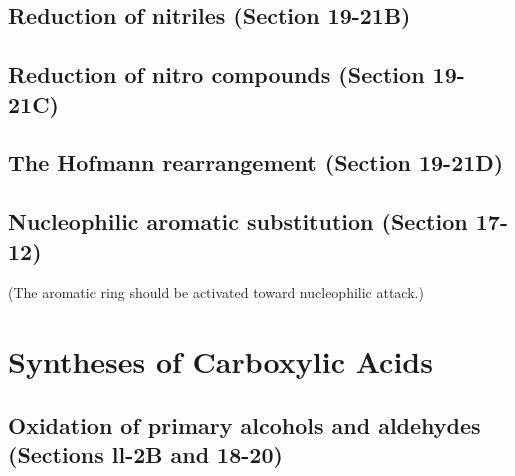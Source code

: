 \subsection{Reduction of nitriles \normalfont(Section 19-21B)}



\subsection{ Reduction of nitro compounds \normalfont(Section 19-21C)}



\subsection{The Hofmann rearrangement \normalfont(Section 19-21D)}



\subsection{Nucleophilic aromatic substitution \normalfont(Section 17-12)}

(The aromatic ring should be activated toward nucleophilic attack.)



\section{Syntheses of Carboxylic Acids}


\subsection{Oxidation of primary alcohols and aldehydes \normalfont(Sections ll-2B and 18-20)}

